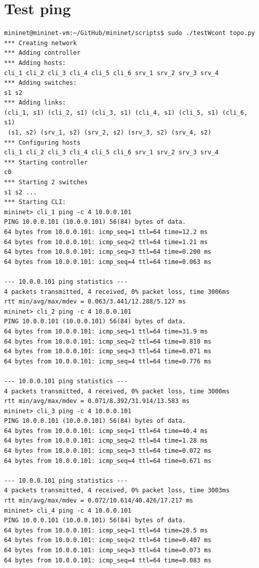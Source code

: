 \documentclass{article}
\begin{document}
\section{Test ping}
\begin{Verbatim}
mininet@mininet-vm:~/GitHub/mininet/scripts$ sudo ./testWcont topo.py
*** Creating network
*** Adding controller
*** Adding hosts:
cli_1 cli_2 cli_3 cli_4 cli_5 cli_6 srv_1 srv_2 srv_3 srv_4
*** Adding switches:
s1 s2
*** Adding links:
(cli_1, s1) (cli_2, s1) (cli_3, s1) (cli_4, s1) (cli_5, s1) (cli_6, s1)
 (s1, s2) (srv_1, s2) (srv_2, s2) (srv_3, s2) (srv_4, s2)
*** Configuring hosts
cli_1 cli_2 cli_3 cli_4 cli_5 cli_6 srv_1 srv_2 srv_3 srv_4
*** Starting controller
c0
*** Starting 2 switches
s1 s2 ...
*** Starting CLI:
mininet> cli_1 ping -c 4 10.0.0.101
PING 10.0.0.101 (10.0.0.101) 56(84) bytes of data.
64 bytes from 10.0.0.101: icmp_seq=1 ttl=64 time=12.2 ms
64 bytes from 10.0.0.101: icmp_seq=2 ttl=64 time=1.21 ms
64 bytes from 10.0.0.101: icmp_seq=3 ttl=64 time=0.200 ms
64 bytes from 10.0.0.101: icmp_seq=4 ttl=64 time=0.063 ms

--- 10.0.0.101 ping statistics ---
4 packets transmitted, 4 received, 0% packet loss, time 3006ms
rtt min/avg/max/mdev = 0.063/3.441/12.288/5.127 ms
mininet> cli_2 ping -c 4 10.0.0.101
PING 10.0.0.101 (10.0.0.101) 56(84) bytes of data.
64 bytes from 10.0.0.101: icmp_seq=1 ttl=64 time=31.9 ms
64 bytes from 10.0.0.101: icmp_seq=2 ttl=64 time=0.810 ms
64 bytes from 10.0.0.101: icmp_seq=3 ttl=64 time=0.071 ms
64 bytes from 10.0.0.101: icmp_seq=4 ttl=64 time=0.776 ms

--- 10.0.0.101 ping statistics ---
4 packets transmitted, 4 received, 0% packet loss, time 3000ms
rtt min/avg/max/mdev = 0.071/8.392/31.914/13.583 ms
mininet> cli_3 ping -c 4 10.0.0.101
PING 10.0.0.101 (10.0.0.101) 56(84) bytes of data.
64 bytes from 10.0.0.101: icmp_seq=1 ttl=64 time=40.4 ms
64 bytes from 10.0.0.101: icmp_seq=2 ttl=64 time=1.28 ms
64 bytes from 10.0.0.101: icmp_seq=3 ttl=64 time=0.072 ms
64 bytes from 10.0.0.101: icmp_seq=4 ttl=64 time=0.671 ms

--- 10.0.0.101 ping statistics ---
4 packets transmitted, 4 received, 0% packet loss, time 3003ms
rtt min/avg/max/mdev = 0.072/10.614/40.426/17.217 ms
mininet> cli_4 ping -c 4 10.0.0.101
PING 10.0.0.101 (10.0.0.101) 56(84) bytes of data.
64 bytes from 10.0.0.101: icmp_seq=1 ttl=64 time=28.5 ms
64 bytes from 10.0.0.101: icmp_seq=2 ttl=64 time=0.407 ms
64 bytes from 10.0.0.101: icmp_seq=3 ttl=64 time=0.073 ms
64 bytes from 10.0.0.101: icmp_seq=4 ttl=64 time=0.083 ms


\end{Verbatim}
\end{document}
